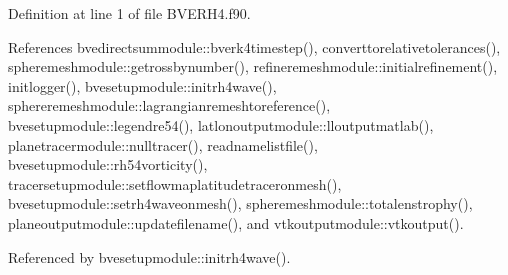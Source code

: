 Definition at line 1 of file B\+V\+E\+R\+H4.\+f90.



References bvedirectsummodule\+::bverk4timestep(), converttorelativetolerances(), spheremeshmodule\+::getrossbynumber(), refineremeshmodule\+::initialrefinement(), initlogger(), bvesetupmodule\+::initrh4wave(), sphereremeshmodule\+::lagrangianremeshtoreference(), bvesetupmodule\+::legendre54(), latlonoutputmodule\+::lloutputmatlab(), planetracermodule\+::nulltracer(), readnamelistfile(), bvesetupmodule\+::rh54vorticity(), tracersetupmodule\+::setflowmaplatitudetraceronmesh(), bvesetupmodule\+::setrh4waveonmesh(), spheremeshmodule\+::totalenstrophy(), planeoutputmodule\+::updatefilename(), and vtkoutputmodule\+::vtkoutput().



Referenced by bvesetupmodule\+::initrh4wave().

